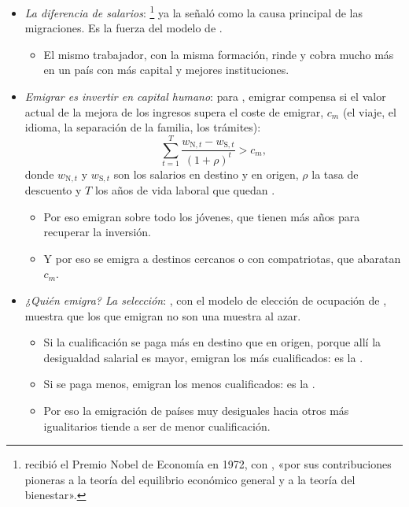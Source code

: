 \documentclass[11pt]{article}
\begin{document}
\begin{itemize}
\item \emph{La diferencia de salarios}: \textcite{Hicks1932Wages}\footnote{ recibió el Premio Nobel de Economía en 1972, con , «por sus contribuciones pioneras a la teoría del equilibrio económico general y a la teoría del bienestar»\nocite{Nobel1972HicksArrow}.} ya la señaló como la causa principal de las migraciones. Es la fuerza del modelo de .
  \begin{itemize}
  \item El mismo trabajador, con la misma formación, rinde y cobra mucho más en un país con más capital y mejores instituciones.
  \end{itemize}
\item \emph{Emigrar es invertir en capital humano}: para \textcite{Sjaastad1962}, emigrar compensa si el valor actual de la mejora de los ingresos supera el coste de emigrar, $c_m$ (el viaje, el idioma, la separación de la familia, los trámites):
\begin{equation}\label{eq:sjaastad}
\sum_{t=1}^{T}\frac{w_{\mathrm N,t}-w_{\mathrm S,t}}{(1+\rho)^t}>c_m ,
\end{equation}
donde $w_{\mathrm N,t}$ y $w_{\mathrm S,t}$ son los salarios en destino y en origen, $\rho$ la tasa de descuento y $T$ los años de vida laboral que quedan .
  \begin{itemize}
  \item Por eso emigran sobre todo los jóvenes, que tienen más años para recuperar la inversión.
  \item Y por eso se emigra a destinos cercanos o con compatriotas, que abaratan $c_m$.
  \end{itemize}
\item \emph{¿Quién emigra? La selección}: \textcite{Borjas1987SelfSelection}, con el modelo de elección de ocupación de \textcite{Roy1951Thoughts}, muestra que los que emigran no son una muestra al azar.
  \begin{itemize}
  \item Si la cualificación se paga más en destino que en origen, porque allí la desigualdad salarial es mayor, emigran los más cualificados: es la .
  \item Si se paga menos, emigran los menos cualificados: es la .
  \item Por eso la emigración de países muy desiguales hacia otros más igualitarios tiende a ser de menor cualificación.
  \end{itemize}
\end{itemize}
\end{document}
